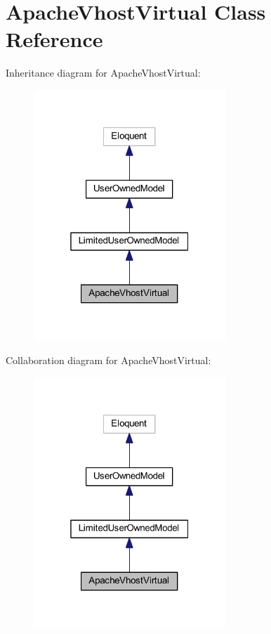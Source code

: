\hypertarget{class_apache_vhost_virtual}{}\section{Apache\+Vhost\+Virtual Class Reference}
\label{class_apache_vhost_virtual}


Inheritance diagram for Apache\+Vhost\+Virtual\+:
\nopagebreak
\begin{figure}[H]
\begin{center}
\leavevmode
\includegraphics[width=205pt]{class_apache_vhost_virtual__inherit__graph}
\end{center}
\end{figure}


Collaboration diagram for Apache\+Vhost\+Virtual\+:
\nopagebreak
\begin{figure}[H]
\begin{center}
\leavevmode
\includegraphics[width=205pt]{class_apache_vhost_virtual__coll__graph}
\end{center}
\end{figure}

